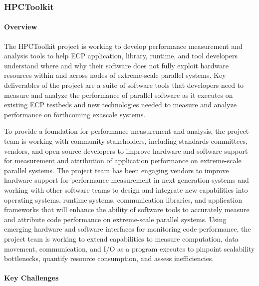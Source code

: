 
\subsubsection{ HPCToolkit} 
\paragraph{Overview} 

The HPCToolkit project is working to develop performance measurement
and analysis tools to help ECP application, library, runtime, and tool
developers understand where and why their software does not fully
exploit hardware resources within and across nodes of extreme-scale
parallel systems. Key deliverables of the project are a suite of
software tools that developers need to measure and analyze the
performance of parallel software as it executes on existing ECP
testbeds and new technologies needed to measure and analyze
performance on forthcoming exascale systems.

To provide a foundation for performance measurement and analysis, the
project team is working with community stakeholders, including
standards committees, vendors, and open source developers to improve
hardware and software support for measurement and attribution of
application performance on extreme-scale parallel systems. The
project team has been engaging vendors to improve hardware support
for performance measurement in next generation systems and working
with other software teams to design and integrate new capabilities
into operating systems, runtime systems, communication libraries, and
application frameworks that will enhance the ability of software
tools to accurately measure and attribute code performance on
extreme-scale parallel systems.  Using emerging hardware and software
interfaces for monitoring code performance, the project team is
working to extend capabilities to measure computation, data movement,
communication, and I/O as a program executes to pinpoint scalability
bottlenecks, quantify resource consumption, and assess
inefficiencies.

\paragraph{Key  Challenges}

